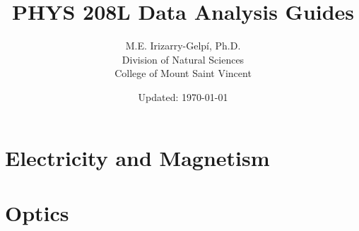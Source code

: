 \documentclass[letterpaper,11pt]{report}
\begin{document}
%
\title{\Huge{PHYS 208L Data Analysis Guides}}
\author{M.E. Irizarry-Gelp\'{i}, Ph.D. \\ Division of Natural Sciences \\ College of Mount Saint Vincent}
\date{Updated: \today}
%
\maketitle
\tableofcontents
%

%
\part{Electricity and Magnetism}
%




% 


%
\part{Optics}






%
\end{document}
